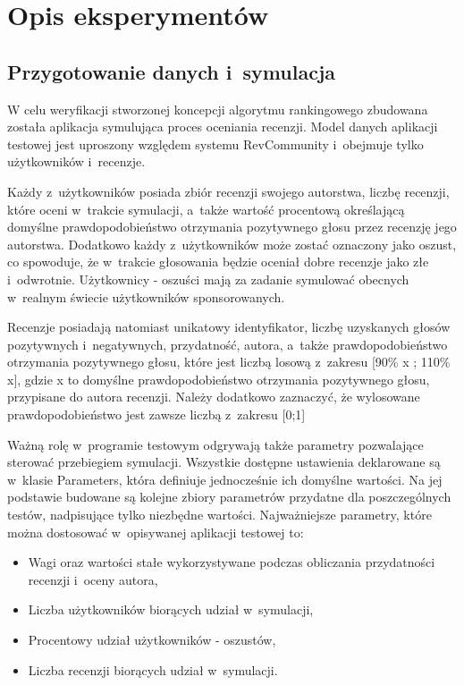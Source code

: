 \section{Opis eksperymentów}

\subsection{Przygotowanie danych i~symulacja}

W celu weryfikacji stworzonej koncepcji algorytmu rankingowego zbudowana została aplikacja symulująca proces oceniania recenzji. Model danych aplikacji testowej jest uproszony względem systemu RevCommunity i~obejmuje tylko użytkowników i~recenzje. 

Każdy z~użytkowników posiada zbiór recenzji swojego autorstwa, liczbę recenzji, które oceni w~trakcie symulacji, a~także wartość procentową określającą  domyślne prawdopodobieństwo otrzymania pozytywnego głosu przez recenzję jego autorstwa. Dodatkowo każdy z~użytkowników może zostać oznaczony jako oszust, co spowoduje, że w~trakcie głosowania będzie oceniał dobre recenzje jako złe i~odwrotnie. Użytkownicy - oszuści mają za zadanie symulować obecnych w~realnym świecie użytkowników sponsorowanych.

Recenzje posiadają natomiast unikatowy identyfikator, liczbę uzyskanych głosów pozytywnych i~negatywnych, przydatność, autora, a~także prawdopodobieństwo otrzymania pozytywnego głosu, które jest liczbą losową z~zakresu [90\% x ; 110\% x], gdzie x to domyślne prawdopodobieństwo otrzymania pozytywnego głosu, przypisane do autora recenzji. Należy dodatkowo zaznaczyć, że wylosowane prawdopodobieństwo jest zawsze liczbą z~zakresu [0;1]

Ważną rolę w~programie testowym odgrywają także parametry pozwalające sterować przebiegiem symulacji. Wszystkie dostępne ustawienia deklarowane są w~klasie Parameters, która definiuje jednocześnie ich domyślne wartości. Na jej podstawie budowane są kolejne zbiory parametrów przydatne dla poszczególnych testów, nadpisujące tylko niezbędne wartości. Najważniejsze parametry, które można dostosować w~opisywanej aplikacji testowej to:

\begin{itemize}
\item Wagi oraz wartości stałe wykorzystywane podczas obliczania przydatności recenzji i~oceny autora,
\item Liczba użytkowników biorących udział w~symulacji,
\item Procentowy udział użytkowników - oszustów,
\item Liczba recenzji biorących udział w~symulacji.
\end{itemize}


